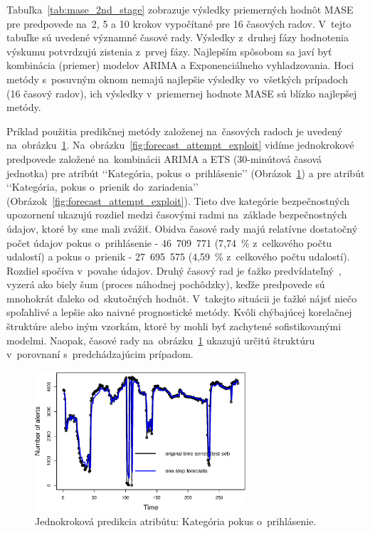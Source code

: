 \documentclass[thesismargins, thesislinespacing, openright, upjsfrontpage]{rnthesis}
\begin{document}
Tabuľka~\ref{tab:mase_2nd_stage} zobrazuje výsledky priemerných hodnôt MASE pre predpovede na~2, 5 a 10 krokov vypočítané pre 16 časových radov. V~tejto tabuľke sú uvedené významné časové rady. Výsledky z~druhej fázy hodnotenia výskumu potvrdzujú zistenia z~prvej fázy. Najlepším spôsobom sa javí byť kombinácia (priemer) modelov ARIMA a Exponenciálneho vyhladzovania. Hoci metódy s~posuvným oknom nemajú najlepšie výsledky vo~všetkých prípadoch (16 časový radov), ich výsledky v~priemernej hodnote MASE sú blízko najlepšej metódy.

Príklad použitia predikčnej metódy založenej na~časových radoch je uvedený na~obrázku~\ref{fig:forecast_attempt_login}. Na~obrázku~\ref{fig:forecast_attempt_exploit} vidíme jednokrokové predpovede založené na~kombinácii ARIMA a ETS (30-minútová časová jednotka) pre atribút ‘‘Kategória, pokus o~prihlásenie’’ (Obrázok~\ref{fig:forecast_attempt_login}) a pre atribút ‘‘Kategória, pokus o~prienik do~zariadenia’’ (Obrázok~\ref{fig:forecast_attempt_exploit}). Tieto dve kategórie bezpečnostných upozornení ukazujú rozdiel medzi časovými radmi na~základe bezpečnostných údajov, ktoré by sme mali zvážiť. Obidva časové rady majú relatívne dostatočný počet údajov pokus o~prihlásenie - 46~709~771 (7,74~\% z~celkového počtu udalostí) a pokus o~prienik - 27~695~575 (4,59~\% z~celkového počtu udalostí). Rozdiel spočíva v~povahe údajov. Druhý časový rad je ťažko predvídateľný~\cite{hendry1995dynamic}, vyzerá ako biely šum (proces náhodnej pochôdzky), keďže predpovede sú mnohokrát ďaleko od~skutočných hodnôt. V~takejto situácii je ťažké nájsť niečo spoľahlivé a lepšie ako naivné prognostické metódy. Kvôli chýbajúcej korelačnej štruktúre alebo iným vzorkám, ktoré by mohli byť zachytené sofistikovanými modelmi. Naopak, časové rady na~obrázku~\ref{fig:forecast_attempt_login} ukazujú určitú štruktúru v~porovnaní s~predchádzajúcim prípadom.

\begin{figure}[h]
  \centering
  \includegraphics[width=0.7\textwidth]{images/item61_1step_forecasts_new.eps}
  \caption{Jednokroková predikcia atribútu: Kategória pokus o~prihlásenie.} 
  \label{fig:forecast_attempt_login}
\end{figure}
\end{document}

